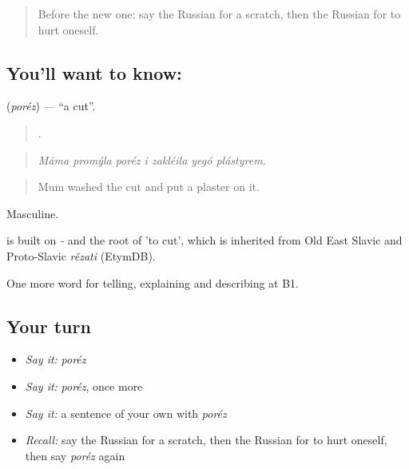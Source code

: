 \label{lesson:RU-C483-porez}



\begin{quote}
Before the new one: say the Russian for a scratch, then the Russian for to hurt oneself.
\end{quote}

\subsection*{You'll want to know: }
\textbf{} (\emph{poréz}) — \textquotedblleft{}a cut\textquotedblright{}.

\begin{quote}
      .
\end{quote}

\begin{quote}
\emph{Máma promýla poréz i zakléila yegó plástyrem.}
\end{quote}

\begin{quote}
Mum washed the cut and put a plaster on it.
\end{quote}

Masculine.

\begin{cousinweb}
\emph{} is built on \emph{-} and the root of \emph{} 'to cut', which is inherited from Old East Slavic and Proto-Slavic \emph{rězati} (EtymDB).
\end{cousinweb}

\begin{grammarlens}[title={What you've built}]
One more word for telling, explaining and describing at B1.
\end{grammarlens}

\subsection*{Your turn}
\begin{itemize}
\raggedright
  \item \emph{Say it:} \emph{poréz}
  \item \emph{Say it:} \emph{poréz}, once more
  \item \emph{Say it:} a sentence of your own with \emph{poréz}
  \item \emph{Recall:} say the Russian for a scratch, then the Russian for to hurt oneself, then say \emph{poréz} again
\end{itemize}

